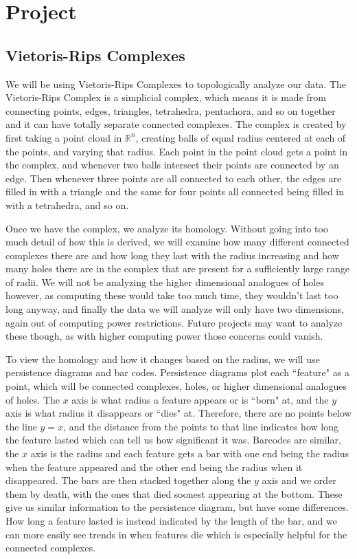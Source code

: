\documentclass[12pt]{report}
\begin{document}
\clearpage
\section*{Project}
\subsection*{Vietoris-Rips Complexes}
We will be using Vietoris-Rips Complexes to topologically analyze our data. The Vietoris-Rips Complex is a simplicial complex, which means it is made from connecting points, edges, triangles, tetrahedra, pentachora, and so on together and it can have totally separate connected complexes. The complex is created by first taking a point cloud in $\mathbb{R}^n$, creating balls of equal radius centered at each of the points, and varying that radius. Each point in the point cloud gets a point in the complex, and whenever two balls intersect their points are connected by an edge. Then whenever three points are all connected to each other, the edges are filled in with a triangle and the same for four points all connected being filled in with a tetrahedra, and so on. 

Once we have the complex, we analyze its homology. Without going into too much detail of how this is derived, we will examine how many different connected complexes there are and how long they last with the radius increasing and how many holes there are in the complex that are present for a sufficiently large range of radii. We will not be analyzing the higher dimensional analogues of holes however, as computing these would take too much time, they wouldn't last too long anyway, and finally the data we will analyze will only have two dimensions, again out of computing power restrictions. Future projects may want to analyze these though, as with higher computing power those concerns could vanish. 

To view the homology and how it changes based on the radius, we will use persistence diagrams and bar codes. Persistence diagrams plot each ``feature" as a point, which will be connected complexes, holes, or higher dimensional analogues of holes. The $x$ axis is what radius a feature appears or is ``born" at, and the $y$ axis is what radius it disappears or ``dies" at. Therefore, there are no points below the line $y=x$, and the distance from the points to that line indicates how long the feature lasted which can tell us how significant it was. Barcodes are similar, the $x$ axis is the radius and each feature gets a bar with one end being the radius when the feature appeared and the other end being the radius when it disappeared. The bars are then stacked together along the $y$ axis and we order them by death, with the ones that died soonest appearing at the bottom. These give us similar information to the persistence diagram, but have some differences. How long a feature lasted is instead indicated by the length of the bar, and we can more easily see trends in when features die which is especially helpful for the connected complexes.
\end{document}
